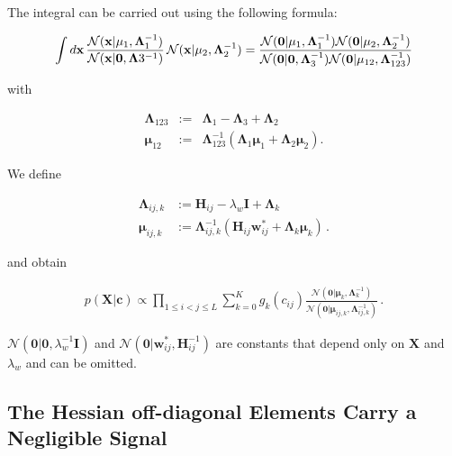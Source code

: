 \documentclass[11pt,a4paper,twoside]{book}
\newcommand{\Gauss}{\mathcal{N}}
\renewcommand{\H}{\mathbf{H}}
\newcommand{\I}{\mathbf{I}}
\newcommand{\Lijk}{\mathbf{\Lambda}_{ij,k}}
\newcommand{\Lk}{\mathbf{\Lambda}_k}
\newcommand{\muijk}{\mathbf{\mu}_{ij,k}}
\newcommand{\muk}{\mathbf{\mu}_k}
\renewcommand{\c}{\mathbf{c}}
\newcommand{\cij}{c_{ij}}
\newcommand{\seq}{\mathbf{x}}
\newcommand{\wij}{\mathbf{w}_{ij}}
\newcommand{\X}{\mathbf{X}}
\theoremstyle{definition}
\theoremstyle{definition}
\theoremstyle{remark}
\begin{document}
The integral can be carried out using the following formula:

\begin{equation}
    \int d\seq \, \frac{ \Gauss( \seq | \mathbf{\mu}_1, \mathbf{\Lambda}_1^{-1}) }{\Gauss(\seq|\mathbf{0},\mathbf{\Lambda}3^{-1})} \, \Gauss(\seq|\mathbf{\mu}_2,\mathbf{\Lambda}_2^{-1}) = \\
    \frac{\Gauss(\mathbf{0}| \mathbf{\mu}_1, \mathbf{\Lambda}_{1}^{-1}) \Gauss(\mathbf{0}| \mathbf{\mu}_2, \mathbf{\Lambda}_{2}^{-1})}{\Gauss(\mathbf{0}|\mathbf{0}, \mathbf{\Lambda}_{3}^{-1}) \Gauss(\mathbf{0}| \mathbf{\mu}_{12}, \mathbf{\Lambda}_{123}^{-1})} 
\end{equation}

with

\begin{eqnarray}
    \mathbf{\Lambda}_{123} &:=& \mathbf{\Lambda}_1 - \mathbf{\Lambda}_3 + \mathbf{\Lambda}_2 \\
    \mathbf{\mu}_{12}  &:=& \mathbf{\Lambda}_{123}^{-1}(\mathbf{\Lambda}_1 \mathbf{\mu}_1 + \mathbf{\Lambda}_2 \mathbf{\mu}_2).
\end{eqnarray}

We define

\begin{align}
    \Lijk   &:= \H_{ij} - \lambda_w \I + \Lk \\ 
    \muijk  &:= \Lijk^{-1}(\H_{ij} \wij^* + \Lk \muk) \,.
\label{eq:def-Jkij}
\end{align}

and obtain

\begin{align}
p(\X | \c) \propto \prod_{1 \le i < j \le L}  \sum_{k=0}^K g_{k}(\cij) \frac{\Gauss( \mathbf{0} | \muk, \Lk^{-1})}{\Gauss(\mathbf{0} | \muijk, \Lijk^{-1})}  \,.
\label{eq:pXr-final}
\end{align}

\(\Gauss( \mathbf{0} | \mathbf{0}, \lambda_w^{-1} \I)\) and
\(\Gauss( \mathbf{0} | \wij^*, \H_{ij}^{-1})\) are constants that depend
only on \(\X\) and \(\lambda_w\) and can be omitted.

\subsection{The Hessian off-diagonal Elements Carry a Negligible
Signal}\label{Hessian-offdiagonal}
\end{document}
